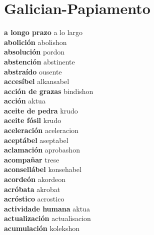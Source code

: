 \twocolumn
\chapter{Galician-Papiamento}
\small
{}\textbf{ a longo prazo  } a lo largo \\
\textbf{ abolición  } abolishon \\
\textbf{ absolución  } pordon \\
\textbf{ abstención  } abstinente \\
\textbf{ abstraído  } ousente \\
\textbf{ accesíbel  } alkansabel \\
\textbf{ acción de grazas  } bindishon \\
\textbf{ acción  } aktua \\
\textbf{ aceite de pedra  } krudo \\
\textbf{ aceite fósil  } krudo \\
\textbf{ aceleración  } aceleracion \\
\textbf{ aceptábel  } aseptabel \\
\textbf{ aclamación  } aprobashon \\
\textbf{ acompañar  } trese \\
\textbf{ aconsellábel  } konsehabel \\
\textbf{ acordeón  } akordeon \\
\textbf{ acróbata  } akrobat \\
\textbf{ acróstico  } acrostico \\
\textbf{ actividade humana  } aktua \\
\textbf{ actualización  } actualisacion \\
\textbf{ acumulación  } kolekshon \\
